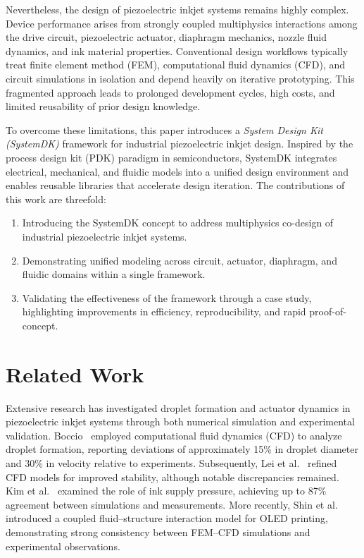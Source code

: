 \documentclass[conference]{IEEEtran}
\begin{document}
Nevertheless, the design of piezoelectric inkjet systems remains highly complex. 
Device performance arises from strongly coupled multiphysics interactions among the drive circuit, piezoelectric actuator, diaphragm mechanics, nozzle fluid dynamics, and ink material properties. 
Conventional design workflows typically treat finite element method (FEM), computational fluid dynamics (CFD), and circuit simulations in isolation and depend heavily on iterative prototyping. 
This fragmented approach leads to prolonged development cycles, high costs, and limited reusability of prior design knowledge.

To overcome these limitations, this paper introduces a \emph{System Design Kit (SystemDK)} framework for industrial piezoelectric inkjet design. 
Inspired by the process design kit (PDK) paradigm in semiconductors, SystemDK integrates electrical, mechanical, and fluidic models into a unified design environment and enables reusable libraries that accelerate design iteration. 
The contributions of this work are threefold:
\begin{enumerate}
  \item Introducing the SystemDK concept to address multiphysics co-design of industrial piezoelectric inkjet systems.
  \item Demonstrating unified modeling across circuit, actuator, diaphragm, and fluidic domains within a single framework.
  \item Validating the effectiveness of the framework through a case study, highlighting improvements in efficiency, reproducibility, and rapid proof-of-concept.
\end{enumerate}

\section{Related Work}
Extensive research has investigated droplet formation and actuator dynamics in piezoelectric inkjet systems through both numerical simulation and experimental validation. 
Boccio~\cite{boccio2003} employed computational fluid dynamics (CFD) to analyze droplet formation, reporting deviations of approximately 15\% in droplet diameter and 30\% in velocity relative to experiments. 
Subsequently, Lei et al.~\cite{lei2012} refined CFD models for improved stability, although notable discrepancies remained. 
Kim et al.~\cite{kim2022} examined the role of ink supply pressure, achieving up to 87\% agreement between simulations and measurements. 
More recently, Shin et al.~\cite{shin2025} introduced a coupled fluid--structure interaction model for OLED printing, demonstrating strong consistency between FEM--CFD simulations and experimental observations.
\end{document}
